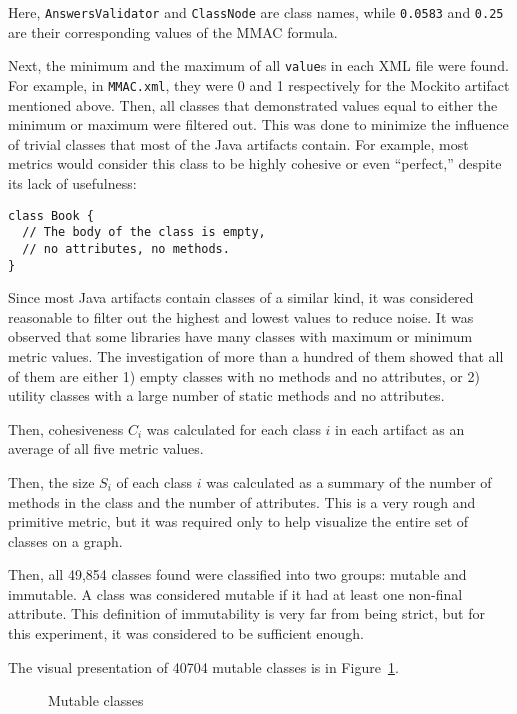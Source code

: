 \documentclass[sigconf,10pt,nonacm=true]{acmart}
\newcommand{\code}[1]{\texttt{#1}}
\begin{document}
Here, \code{AnswersValidator} and \code{ClassNode} are class names,
while \code{0.0583} and \code{0.25} are their corresponding values of
the MMAC formula.

Next, the minimum and the maximum of all \code{value}s in each XML file were found.
For example, in \code{MMAC.xml}, they were 0 and 1 respectively for the Mockito
artifact mentioned above. Then, all classes that
demonstrated values equal to either the minimum or maximum were filtered out. This was done
to minimize the influence of trivial classes that most of the Java artifacts
contain. For example, most metrics would consider this class to be highly cohesive
or even ``perfect,'' despite its lack of usefulness:

\begin{verbatim}
class Book {
  // The body of the class is empty,
  // no attributes, no methods.
}
\end{verbatim}

Since most Java artifacts contain classes of a similar kind, it was considered
reasonable to filter out the highest and lowest values to reduce noise. It was
observed that some libraries have many classes with maximum or minimum metric
values. The investigation of more than a hundred of them showed that
all of them are either 1) empty classes with no methods and no attributes,
or 2) utility classes with a large number of static methods and no attributes.

Then, cohesiveness $C_i$ was calculated for each class $i$ in each
artifact as an average of all five metric values.

Then, the size $S_i$ of each class $i$ was calculated as a summary of the
number of methods in the class and the number of attributes. This is
a very rough and primitive metric, but it was required only to help visualize
the entire set of classes on a graph.

Then, all 49,854 classes found were classified into two groups: mutable and immutable.
A class was considered mutable if it had at least one non-final attribute.
This definition of immutability is very far from being strict, but for
this experiment, it was considered to be sufficient enough.

The visual presentation of 40704 mutable classes is in Figure~\ref{fig:1}.

\begin{figure}[h]
  
  \caption{Mutable classes}
  \label{fig:1}
\end{figure}
\end{document}
